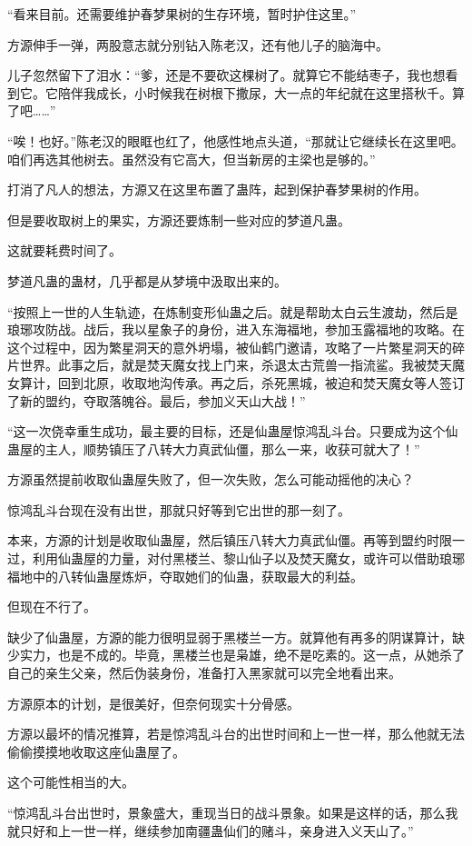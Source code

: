 \begin{this_body}
“看来目前。还需要维护春梦果树的生存环境，暂时护住这里。”

方源伸手一弹，两股意志就分别钻入陈老汉，还有他儿子的脑海中。

儿子忽然留下了泪水：“爹，还是不要砍这棵树了。就算它不能结枣子，我也想看到它。它陪伴我成长，小时候我在树根下撒尿，大一点的年纪就在这里搭秋千。算了吧……”

“唉！也好。”陈老汉的眼眶也红了，他感性地点头道，“那就让它继续长在这里吧。咱们再选其他树去。虽然没有它高大，但当新房的主梁也是够的。”

打消了凡人的想法，方源又在这里布置了蛊阵，起到保护春梦果树的作用。

但是要收取树上的果实，方源还要炼制一些对应的梦道凡蛊。

这就要耗费时间了。

梦道凡蛊的蛊材，几乎都是从梦境中汲取出来的。

“按照上一世的人生轨迹，在炼制变形仙蛊之后。就是帮助太白云生渡劫，然后是琅琊攻防战。战后，我以星象子的身份，进入东海福地，参加玉露福地的攻略。在这个过程中，因为繁星洞天的意外坍塌，被仙鹤门邀请，攻略了一片繁星洞天的碎片世界。此事之后，就是焚天魔女找上门来，杀退太古荒兽一指流鲨。我被焚天魔女算计，回到北原，收取地沟传承。再之后，杀死黑城，被迫和焚天魔女等人签订了新的盟约，夺取落魄谷。最后，参加义天山大战！”

“这一次侥幸重生成功，最主要的目标，还是仙蛊屋惊鸿乱斗台。只要成为这个仙蛊屋的主人，顺势镇压了八转大力真武仙僵，那么一来，收获可就大了！”

方源虽然提前收取仙蛊屋失败了，但一次失败，怎么可能动摇他的决心？

惊鸿乱斗台现在没有出世，那就只好等到它出世的那一刻了。

本来，方源的计划是收取仙蛊屋，然后镇压八转大力真武仙僵。再等到盟约时限一过，利用仙蛊屋的力量，对付黑楼兰、黎山仙子以及焚天魔女，或许可以借助琅琊福地中的八转仙蛊屋炼炉，夺取她们的仙蛊，获取最大的利益。

但现在不行了。

缺少了仙蛊屋，方源的能力很明显弱于黑楼兰一方。就算他有再多的阴谋算计，缺少实力，也是不成的。毕竟，黑楼兰也是枭雄，绝不是吃素的。这一点，从她杀了自己的亲生父亲，然后伪装身份，准备打入黑家就可以完全地看出来。

方源原本的计划，是很美好，但奈何现实十分骨感。

方源以最坏的情况推算，若是惊鸿乱斗台的出世时间和上一世一样，那么他就无法偷偷摸摸地收取这座仙蛊屋了。

这个可能性相当的大。

“惊鸿乱斗台出世时，景象盛大，重现当日的战斗景象。如果是这样的话，那么我就只好和上一世一样，继续参加南疆蛊仙们的赌斗，亲身进入义天山了。”


\end{this_body}
